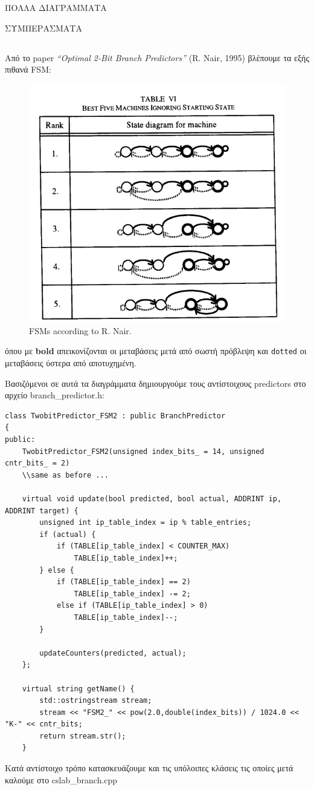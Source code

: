 \documentclass{article}
\begin{document}
ΠΟΛΛΑ ΔΙΑΓΡΑΜΜΑΤΑ

ΣΥΜΠΕΡΑΣΜΑΤΑ

\subsection{}
Από το paper \textit{“Optimal 2-Bit Branch Predictors”} (R. Nair, 1995) βλέπουμε τα εξής πιθανά FSM:

\begin{figure}[h!]
    \centering
    \includegraphics[width=0.5\linewidth]{figures/FMS.png}
    \caption{FSMs according to R. Nair.}
    \label{fig:enter-label}
\end{figure}

όπου με \textbf{bold} απεικονίζονται οι μεταβάσεις μετά από σωστή πρόβλεψη και \texttt{dotted} οι μεταβάσεις ύστερα από αποτυχημένη.

Βασιζόμενοι σε αυτά τα διαγράμματα δημιουργούμε τους αντίστοιχους predictors στο αρχείο branch\_predictor.h:
\begin{lstlisting}[style=cppstyle]
class TwobitPredictor_FSM2 : public BranchPredictor
{
public:
    TwobitPredictor_FSM2(unsigned index_bits_ = 14, unsigned cntr_bits_ = 2)
    \\same as before ...

    virtual void update(bool predicted, bool actual, ADDRINT ip, ADDRINT target) {
        unsigned int ip_table_index = ip % table_entries;
        if (actual) {
            if (TABLE[ip_table_index] < COUNTER_MAX)
                TABLE[ip_table_index]++;
        } else {
            if (TABLE[ip_table_index] == 2)
                TABLE[ip_table_index] -= 2;
            else if (TABLE[ip_table_index] > 0)
                TABLE[ip_table_index]--;
        }
        
        updateCounters(predicted, actual);
    };

    virtual string getName() {
        std::ostringstream stream;
        stream << "FSM2_" << pow(2.0,double(index_bits)) / 1024.0 << "K-" << cntr_bits;
        return stream.str();
    }
\end{lstlisting}
Κατά αντίστοιχο τρόπο κατασκευάζουμε και τις υπόλοιπες κλάσεις τις οποίες μετά καλούμε στο cslab\_branch.cpp
\end{document}
